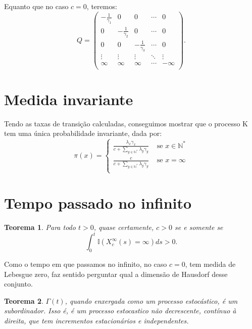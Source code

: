 \documentclass[11pt,twoside,a4paper]{article}
\newcommand{\Nz}{{\mathbb{N^*}}}
\newcommand{\ind}{{\mathbb{I}}}
\newtheorem{teorema}{Teorema}[section]
\begin{document}
Equanto que no caso $c=0$, teremos:
\begin{displaymath}
  Q = \left(
    \begin{array}{ccccc}
      -\frac{1}{\gamma_1} & 0 & 0 & \cdots & 0\\
      0 & -\frac{1}{\gamma_2} & 0 & \cdots & 0\\
      0 & 0 & -\frac{1}{\gamma_3} & \cdots & 0\\
      \vdots & \vdots & \vdots & \ddots & \vdots \\
      \infty & \infty & \infty & \cdots & -\infty\\
    \end{array}
  \right).
\end{displaymath}

\section{Medida invariante}
\label{sec:invariante}

Tendo as taxas de transição calculadas, conseguimos mostrar que o
processo K tem uma única probabilidade invariante, dada por:
\begin{equation}
  \label{eq:invariante}
  \pi(x) = \begin{cases}
    \frac{\lambda_x \gamma_x}{c + \sum_{y \in \Nz} \lambda_y \gamma_y}
    & \textrm{ se } x \in \Nz \\
    \frac{c}{c + \sum_{y \in \Nz} \lambda_y \gamma_y}
    & \textrm{ se } x = \infty \\
  \end{cases}
\end{equation}


\section{Tempo passado no infinito}

\begin{teorema}
  Para todo $t > 0$, quase certamente, $c > 0$ se e somente se 
  \begin{displaymath}
    \int_0^t \ind (X^\infty_c(s) = \infty) ds > 0.
  \end{displaymath}
\end{teorema}

Como o tempo em que passamos no infinito, no caso $c = 0$, tem medida
de Lebesgue zero, faz sentido perguntar qual a dimensão de Hausdorf
desse conjunto.

\begin{teorema}
  $\Gamma(t)$, quando enxergada como um processo estocástico, é um
  subordinador. Isso é, é um processo estocastico não decrescente,
  contínuo à direita, que tem incrementos estacionários e independentes.
\end{teorema}
\end{document}
